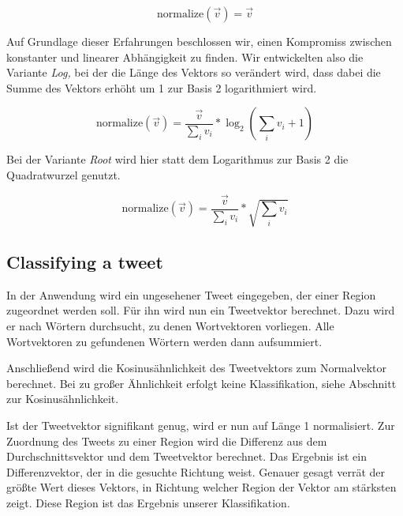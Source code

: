 \documentclass[../Main.tex]{subfiles}
\begin{document}
$$\text{normalize}(\vec v) = \vec v$$

Auf Grundlage dieser Erfahrungen beschlossen wir, einen Kompromiss zwischen konstanter und linearer Abhängigkeit zu finden. Wir entwickelten also die Variante \textit{Log,} bei der die Länge des Vektors so verändert wird, dass dabei die Summe des Vektors erhöht um 1 zur Basis 2 logarithmiert wird.

$$\text{normalize}(\vec v) = \frac{\vec v}{\sum_i v_i} * \log_2(\sum_i v_i+1)$$

Bei der Variante \textit{Root} wird hier statt dem Logarithmus zur Basis 2 die Quadratwurzel genutzt.

$$\text{normalize}(\vec v) = \frac{\vec v}{\sum_i v_i} * \sqrt{\sum_i v_i}$$

\subsection{Classifying a tweet}
In der Anwendung wird ein ungesehener Tweet eingegeben, der einer Region zugeordnet werden soll. Für ihn wird nun ein Tweetvektor berechnet. Dazu wird er nach Wörtern durchsucht, zu denen Wortvektoren vorliegen. Alle Wortvektoren zu gefundenen Wörtern werden dann aufsummiert.

Anschließend wird die Kosinusähnlichkeit des Tweetvektors zum Normalvektor berechnet. Bei zu großer Ähnlichkeit erfolgt keine Klassifikation, siehe Abschnitt zur Kosinusähnlichkeit.

Ist der Tweetvektor signifikant genug, wird er nun auf Länge 1 normalisiert. Zur Zuordnung des Tweets zu einer Region wird die Differenz aus dem Durchschnittsvektor und dem Tweetvektor berechnet. Das Ergebnis ist ein Differenzvektor, der in die gesuchte Richtung weist. Genauer gesagt verrät der größte Wert dieses Vektors, in Richtung welcher Region der Vektor am stärksten zeigt. Diese Region ist das Ergebnis unserer Klassifikation.
\end{document}
